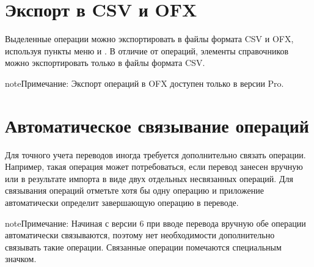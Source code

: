 \documentclass[a4paper,10pt,russian]{sphinxmanual}
\begin{document}
\noindent{}
\noindent{}
\noindent{}


\section{Экспорт в CSV и OFX}
\label{\detokenize{bulk-actions:csv-ofx}}
Выделенные операции можно экспортировать в файлы формата CSV и OFX, используя пункты меню 
и . В отличие от операций, элементы справочников можно экспортировать только в файлы формата
CSV.

\begin{sphinxadmonition}{note}{Примечание:}
Экспорт операций в OFX доступен только в версии Pro.
\end{sphinxadmonition}

\noindent{}
\noindent{}
\noindent{}


\section{Автоматическое связывание операций}
\label{\detokenize{bulk-actions:id7}}
Для точного учета переводов иногда требуется дополнительно связать операции. Например,
такая операция может потребоваться, если перевод занесен вручную или в результате импорта
в виде двух отдельных несвязанных операций. Для связывания операций отметьте хотя бы
одну операцию и приложение автоматически определит завершающую операцию в переводе.

\noindent{}

\begin{sphinxadmonition}{note}{Примечание:}
Начиная с версии 6 при вводе перевода вручную обе операции автоматически связываются, поэтому нет
необходимости дополнительно связывать такие операции. Связанные операции помечаются специальным значком.
\end{sphinxadmonition}
\end{document}
